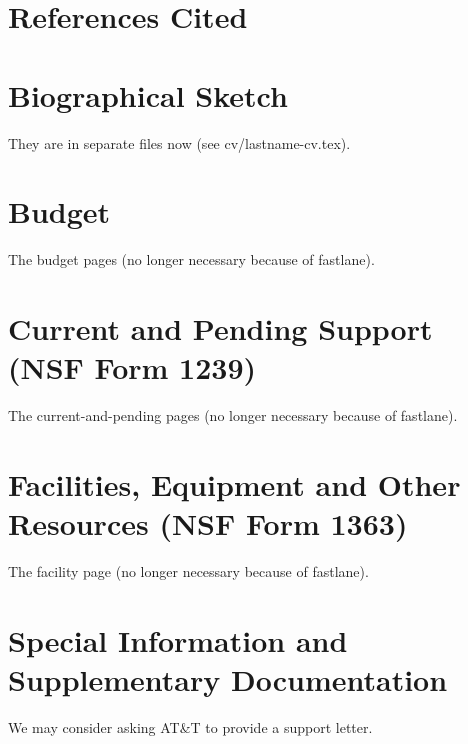 \documentclass[11pt]{article}
\begin{document}
\section{References Cited}

{

}
\newpage
\section{Biographical Sketch}
%

They are in separate files now (see cv/lastname-cv.tex).

\section{Budget}

The budget pages (no longer necessary because of fastlane). 

\section{Current and Pending Support (NSF Form 1239)}

The current-and-pending pages (no longer necessary because of fastlane). 

\section{Facilities, Equipment and Other Resources (NSF Form 1363)}

The facility page (no longer necessary because of fastlane).

\section{Special Information and Supplementary Documentation}

We may consider asking AT\&{}T to provide a support letter.
\end{document}
